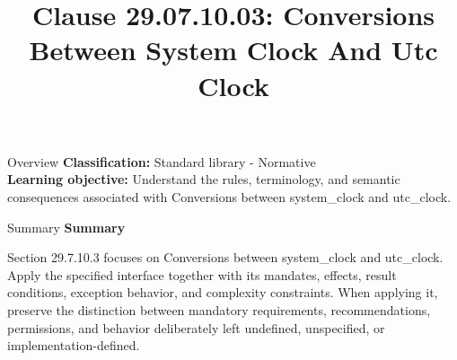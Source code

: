 \documentclass[10pt,letterpaper]{article}
\title{Clause 29.07.10.03: Conversions Between System Clock And Utc Clock}
\author{}
\date{}
\begin{document}
\maketitle
\begin{CornellOverviewBox}{Overview}
\textbf{Classification:} Standard library - Normative\\[2pt]
\textbf{Learning objective:} Understand the rules, terminology, and semantic consequences associated with Conversions between system\_clock and utc\_clock.
\end{CornellOverviewBox}\begin{CornellSummaryBox}{Summary}
{\sffamily\bfseries\color{Accent} Summary}\par\vspace{3pt}Section 29.7.10.3 focuses on Conversions between system\_clock and utc\_clock. Apply the specified interface together with its mandates, effects, result conditions, exception behavior, and complexity constraints. When applying it, preserve the distinction between mandatory requirements, recommendations, permissions, and behavior deliberately left undefined, unspecified, or implementation-defined.
\end{CornellSummaryBox}
\end{document}
